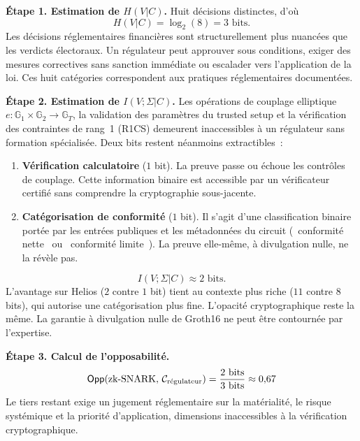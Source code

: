 \begin{sloppypar}
\noindent\textbf{\'Etape 1. Estimation de $H(V|C)$.} Huit d\'ecisions
distinctes, d'o\`u
\begin{equation}
H(V|C) = \log_2(8) = 3 \text{ bits}.
\label{eq:hvc_zksnark}
\end{equation}
Les d\'ecisions r\'eglementaires financi\`eres sont structurellement plus
nuanc\'ees que les verdicts \'electoraux. Un r\'egulateur peut approuver sous
conditions, exiger des mesures correctives sans sanction imm\'ediate ou
escalader vers l'application de la loi. Ces huit cat\'egories correspondent aux
pratiques r\'eglementaires document\'ees.

\noindent\textbf{\'Etape 2. Estimation de $I(V;\Sigma|C)$.} Les op\'erations de
couplage elliptique $e: \mathbb{G}_1 \times \mathbb{G}_2 \to \mathbb{G}_T$, la
validation des param\`etres du trusted setup et la v\'erification des
contraintes de rang~1 (R1CS) demeurent inaccessibles \`a un r\'egulateur sans formation
sp\'ecialis\'ee. Deux bits restent n\'eanmoins extractibles~:
\begin{enumerate}
\item \textbf{V\'erification calculatoire} ($1$ bit). La preuve passe ou
      \'echoue les contr\^oles de couplage. Cette information binaire est accessible par
      un v\'erificateur certifi\'e sans comprendre la cryptographie sous-jacente.
\item \textbf{Cat\'egorisation de conformit\'e} ($1$ bit). Il s'agit d'une classification
      binaire port\'ee par les entr\'ees publiques et les m\'etadonn\'ees du circuit
      (\guillemotleft~conformit\'e nette~\guillemotright{} ou \guillemotleft~conformit\'e limite~\guillemotright).
      La preuve elle-m\^eme, \`a divulgation nulle, ne la r\'ev\`ele pas.
\end{enumerate}
\begin{equation}
I(V;\Sigma|C) \approx 2 \text{ bits}.
\label{eq:ivc_zksnark}
\end{equation}
L'avantage sur Helios ($2$ contre $1$ bit) tient au contexte plus riche
($11$ contre $8$ bits), qui autorise une cat\'egorisation plus fine. L'opacit\'e
cryptographique reste la m\^eme. La garantie \`a divulgation nulle de
Groth16 ne peut \^etre contourn\'ee par l'expertise.

\noindent\textbf{\'Etape 3. Calcul de l'opposabilit\'e.}
\begin{equation}
\mathsf{Opp}(\text{zk-SNARK},\, \mathcal{C}_{\text{r\'egulateur}})
= \frac{2 \text{ bits}}{3 \text{ bits}} \approx 0{,}67
\label{eq:opp_zksnark}
\end{equation}
Le tiers restant exige un jugement r\'eglementaire sur la mat\'erialit\'e, le
risque syst\'emique et la priorit\'e d'application, dimensions inaccessibles
\`a la v\'erification cryptographique.


\end{sloppypar}
